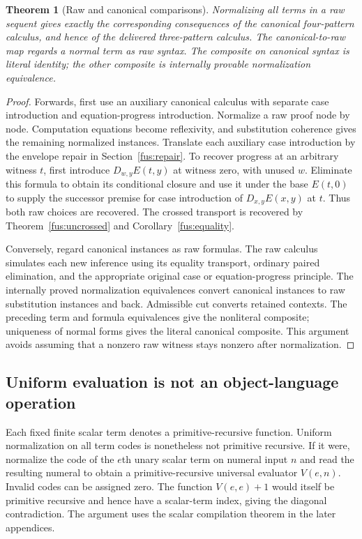 \documentclass[11pt,letterpaper]{article}
\newtheorem{theorem}{Theorem}[section]
\theoremstyle{definition}\newtheorem{definition}[theorem]{Definition}
\theoremstyle{remark}\newtheorem{remark}[theorem]{Remark}
\begin{document}
\begin{theorem}[Raw and canonical comparisons]
Normalizing all terms in a raw sequent gives exactly the corresponding
consequences of the canonical four-pattern calculus, and hence of the
delivered three-pattern calculus. The canonical-to-raw map regards a normal
term as raw syntax. The composite on canonical syntax is literal identity;
the other composite is internally provable normalization equivalence.
\end{theorem}
\begin{proof}
Forwards, first use an auxiliary canonical calculus with separate case
introduction and equation-progress introduction. Normalize a raw proof
node by node. Computation equations become reflexivity, and substitution
coherence gives the remaining normalized instances. Translate each
auxiliary case introduction by the envelope repair in
Section~\ref{fus:repair}. To recover progress at an arbitrary witness $t$,
first introduce $D_{w,y}E(t,y)$ at witness zero, with unused $w$.
Eliminate this formula to obtain its conditional closure and use it under
the base $E(t,0)$ to supply the successor premise for case introduction
of $D_{x,y}E(x,y)$ at $t$. Thus both raw choices are recovered.
The crossed transport is recovered by Theorem~\ref{fus:uncrossed} and
Corollary~\ref{fus:equality}.

Conversely, regard canonical instances as raw formulas. The raw calculus
simulates each new inference using its equality transport, ordinary
paired elimination, and the appropriate original case or equation-progress
principle. The internally proved normalization equivalences convert
canonical instances to raw substitution instances and back. Admissible
cut converts retained contexts. The preceding term and formula equivalences
give the nonliteral composite; uniqueness of normal forms gives the
literal canonical composite. This argument avoids assuming that a
nonzero raw witness stays nonzero after normalization.
\end{proof}

\subsection{Uniform evaluation is not an object-language operation}

Each fixed finite scalar term denotes a primitive-recursive function.
Uniform normalization on all term codes is nonetheless not primitive
recursive. If it were, normalize the code of the $e$th unary scalar term
on numeral input $n$ and read the resulting numeral to obtain a
primitive-recursive universal evaluator $V(e,n)$. Invalid codes can be
assigned zero. The function $V(e,e)+1$ would itself be primitive recursive
and hence have a scalar-term index, giving the diagonal contradiction.
The argument uses the scalar compilation theorem in the later appendices.
\end{document}
